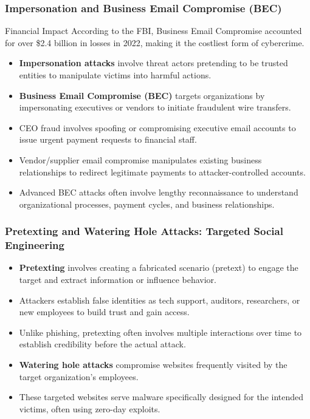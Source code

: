 \documentclass{beamer}
\begin{document}
\begin{frame}
    \frametitle{Impersonation and Business Email Compromise (BEC)}
    
    \begin{block}{Financial Impact}
        According to the FBI, Business Email Compromise accounted for over \$2.4 billion in losses in 2022, making it the costliest form of cybercrime.
    \end{block}
    
    \begin{itemize}
        \item \textbf{Impersonation attacks} involve threat actors pretending to be trusted entities to manipulate victims into harmful actions.
        \item \textbf{Business Email Compromise (BEC)} targets organizations by impersonating executives or vendors to initiate fraudulent wire transfers.
        \item CEO fraud involves spoofing or compromising executive email accounts to issue urgent payment requests to financial staff.
        \item Vendor/supplier email compromise manipulates existing business relationships to redirect legitimate payments to attacker-controlled accounts.
        \item Advanced BEC attacks often involve lengthy reconnaissance to understand organizational processes, payment cycles, and business relationships.
    \end{itemize}
\end{frame}

\begin{frame}
    \frametitle{Pretexting and Watering Hole Attacks: Targeted Social Engineering}
    
    \begin{itemize}
        \item \textbf{Pretexting} involves creating a fabricated scenario (pretext) to engage the target and extract information or influence behavior.
        \item Attackers establish false identities as tech support, auditors, researchers, or new employees to build trust and gain access.
        \item Unlike phishing, pretexting often involves multiple interactions over time to establish credibility before the actual attack.
        \item \textbf{Watering hole attacks} compromise websites frequently visited by the target organization's employees.
        \item These targeted websites serve malware specifically designed for the intended victims, often using zero-day exploits.
    \end{itemize}
\end{frame}
\end{document}
